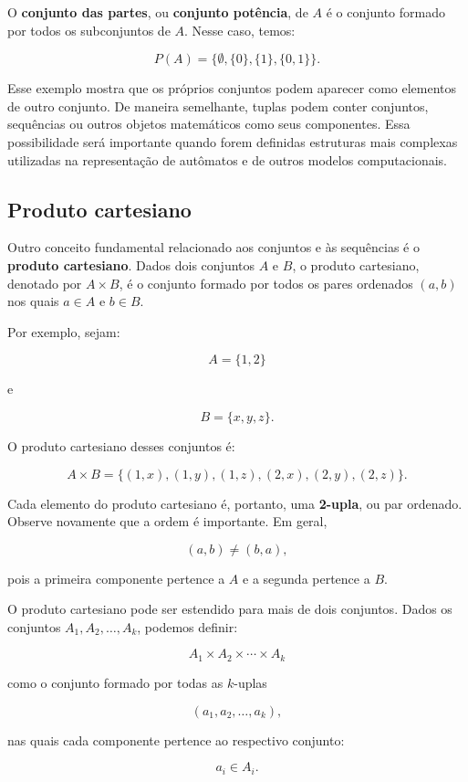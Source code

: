 \documentclass[
  brazilian,
  letterpaper,
]{book}
\theoremstyle{plain}
\theoremstyle{definition}
\theoremstyle{remark}
\begin{document}
O \textbf{conjunto das partes}, ou \textbf{conjunto potência}, de \(A\)
é o conjunto formado por todos os subconjuntos de \(A\). Nesse caso,
temos:

\[
P(A)=\{\emptyset,\{0\},\{1\},\{0,1\}\}.
\]

Esse exemplo mostra que os próprios conjuntos podem aparecer como
elementos de outro conjunto. De maneira semelhante, tuplas podem conter
conjuntos, sequências ou outros objetos matemáticos como seus
componentes. Essa possibilidade será importante quando forem definidas
estruturas mais complexas utilizadas na representação de autômatos e de
outros modelos computacionais.

\subsection{Produto cartesiano}\label{produto-cartesiano}

Outro conceito fundamental relacionado aos conjuntos e às sequências é o
\textbf{produto cartesiano}. Dados dois conjuntos \(A\) e \(B\), o
produto cartesiano, denotado por \(A\times B\), é o conjunto formado por
todos os pares ordenados \((a,b)\) nos quais \(a\in A\) e \(b\in B\).

Por exemplo, sejam:

\[
A=\{1,2\}
\]

e

\[
B=\{x,y,z\}.
\]

O produto cartesiano desses conjuntos é:

\[
A\times B=
\{(1,x),(1,y),(1,z),(2,x),(2,y),(2,z)\}.
\]

Cada elemento do produto cartesiano é, portanto, uma \textbf{2-upla}, ou
par ordenado. Observe novamente que a ordem é importante. Em geral,

\[
(a,b)\neq(b,a),
\]

pois a primeira componente pertence a \(A\) e a segunda pertence a
\(B\).

O produto cartesiano pode ser estendido para mais de dois conjuntos.
Dados os conjuntos \(A_1,A_2,\ldots,A_k\), podemos definir:

\[
A_1\times A_2\times\cdots\times A_k
\]

como o conjunto formado por todas as \(k\)-uplas

\[
(a_1,a_2,\ldots,a_k),
\]

nas quais cada componente pertence ao respectivo conjunto:

\[
a_i\in A_i.
\]
\end{document}
